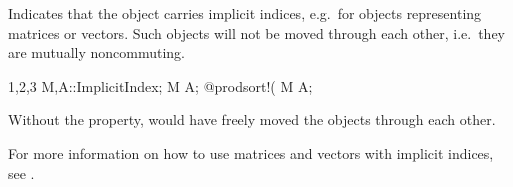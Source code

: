 
Indicates that the object carries implicit indices, e.g.~for objects
representing matrices or vectors. Such objects will not be moved
through each other, i.e.~they are mutually noncommuting.
\begin{screen}{1,2,3}
{M,A}::ImplicitIndex;
M A;
@prodsort!(%
M A;
\end{screen}
Without the  property, 
would have freely moved the objects through each other.

For more information on how to use matrices and vectors with implicit
indices, see .


